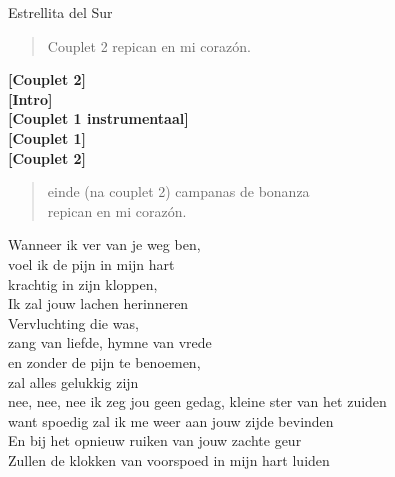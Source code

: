 \begin{song}[vals]{Estrellita del Sur}
\begin{verse}{Couplet 2}
repican en mi corazón.\\
\end{verse}
\textbf{[Couplet 2]}\\
\textbf{[Intro]}\\
\textbf{[Couplet 1 instrumentaal]}\\
\textbf{[Couplet 1]}\\
\textbf{[Couplet 2]}\\
\begin{verse}{einde (na couplet 2)}
campanas de bonanza\\
repican en mi corazón.\hspace{1em}\hspace{2em}\hspace{1.5em}\\
\end{verse}
\begin{translation}
Wanneer ik ver van je weg ben,\\
voel ik de pijn in mijn hart\\
krachtig in zijn kloppen,\\
Ik zal jouw lachen herinneren\\
Vervluchting die was,\\
zang van liefde, hymne van vrede\\
en zonder de pijn te benoemen,\\
zal alles gelukkig zijn\\
\vspace{1em}
nee, nee, nee ik zeg jou geen gedag, kleine ster van het zuiden\\
want spoedig zal ik me weer aan jouw zijde bevinden\\
En bij het opnieuw ruiken van jouw zachte geur\\
Zullen de klokken van voorspoed in mijn hart luiden\\
\end{translation}
\end{song}

